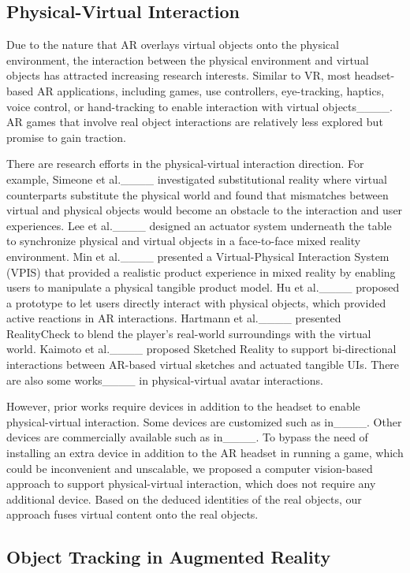 \subsection{Physical-Virtual Interaction}
Due to the nature that AR overlays virtual objects onto the physical environment, the interaction between the physical environment and virtual objects has attracted increasing research interests. Similar to VR, most headset-based AR applications, including games, use controllers, eye-tracking, haptics, voice control, or hand-tracking to enable interaction with virtual objects____. AR games that involve real object interactions are relatively less explored but promise to gain traction.%

There are research efforts in the physical-virtual interaction direction. For example, Simeone et al.____ investigated substitutional reality where virtual counterparts substitute the physical world and found that mismatches between virtual and physical objects would become an obstacle to the interaction and user experiences. Lee et al.____ designed an actuator system underneath the table to synchronize physical and virtual objects in a face-to-face mixed reality environment. Min et al.____ presented a Virtual-Physical Interaction System (VPIS) that provided a realistic product experience in mixed reality by enabling users to manipulate a physical tangible product model. Hu et al.____ proposed a prototype to let users directly interact with physical objects, which provided active reactions in AR interactions. Hartmann et al.____ presented RealityCheck to blend the player's real-world surroundings with the virtual world. Kaimoto et al.____ proposed Sketched Reality to support bi-directional interactions between AR-based virtual sketches and actuated tangible UIs. There are also some works____ in physical-virtual avatar interactions.

However, prior works require devices in addition to the headset to enable physical-virtual interaction. Some devices are customized such as in____. Other devices are commercially available such as in____. To bypass the need of installing an extra device in addition to the AR headset in running a game, which could be inconvenient and unscalable, we proposed a computer vision-based approach to support physical-virtual interaction, which does not require any additional device. Based on the deduced identities of the real objects, our approach fuses virtual content onto the real objects. 

\subsection{Object Tracking in Augmented Reality}

